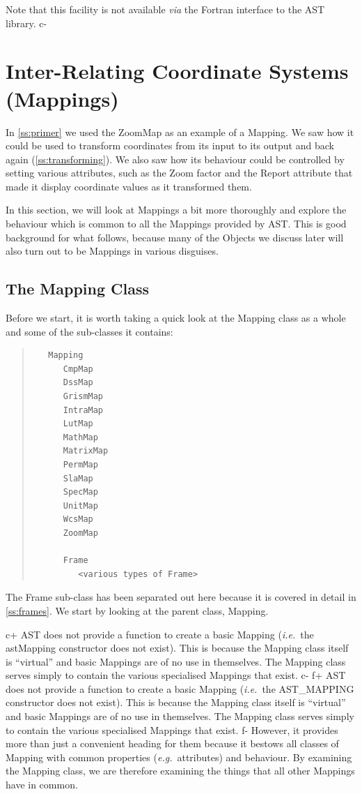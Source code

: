 \documentclass[twoside,11pt]{article}
\newcommand{\secref}[1]{\S\ref{#1}}
\renewcommand{\secref}[1]{\ref{#1}}
\begin{document}
Note that this facility is not available {\em{via}} the Fortran
interface to the AST library.
c-

\cleardoublepage
\section{\label{ss:mappings}Inter-Relating Coordinate Systems (Mappings)}

In \secref{ss:primer} we used the ZoomMap as an example of a
Mapping. We saw how it could be used to transform coordinates from its
input to its output and back again (\secref{ss:transforming}). We also
saw how its behaviour could be controlled by setting various
attributes, such as the Zoom factor and the Report attribute that made
it display coordinate values as it transformed them.

In this section, we will look at Mappings a bit more thoroughly and
explore the behaviour which is common to all the Mappings provided by
AST.  This is good background for what follows, because many of the
Objects we discuss later will also turn out to be Mappings in various
disguises.

\subsection{\label{ss:mappingclass}The Mapping Class}

Before we start, it is worth taking a quick look at the Mapping class
as a whole and some of the sub-classes it contains:

\begin{quote}
\begin{verbatim}
   Mapping
      CmpMap
      DssMap
      GrismMap
      IntraMap
      LutMap
      MathMap
      MatrixMap
      PermMap
      SlaMap
      SpecMap
      UnitMap
      WcsMap
      ZoomMap

      Frame
         <various types of Frame>
\end{verbatim}
\end{quote}

The Frame sub-class has been separated out here because it is covered
in detail in \secref{ss:frames}. We start by looking at the parent
class, Mapping.

c+
AST does not provide a function to create a basic Mapping
({\em{i.e.}}\ the astMapping constructor does not exist). This is
because the Mapping class itself is ``virtual'' and basic Mappings are
of no use in themselves. The Mapping class serves simply to contain
the various specialised Mappings that exist.
c-
f+
AST does not provide a function to create a basic Mapping
({\em{i.e.}}\ the AST\_MAPPING constructor does not exist). This is
because the Mapping class itself is ``virtual'' and basic Mappings are
of no use in themselves. The Mapping class serves simply to contain
the various specialised Mappings that exist.
f-
However, it provides more than just a convenient heading for them
because it bestows all classes of Mapping with common properties
({\em{e.g.}}\ attributes) and behaviour.  By examining the Mapping
class, we are therefore examining the things that all other Mappings
have in common.
\end{document}
